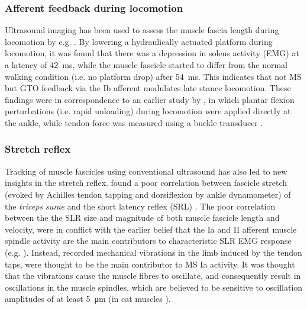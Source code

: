 \subsubsection{Afferent feedback during locomotion}
Ultrasound imaging has been used to assess the muscle fascia length during locomotion by e.g. \citeauthor{klint_afferent_2009} \cite{klint_afferent_2009}. By lowering a hydraulically actuated platform during locomotion, it was found that there was a depression in soleus activity (EMG) at a latency of \SI{42}{\milli\second}, while the muscle fascicle started to differ from the normal walking condition (i.e. no platform drop) after \SI{54}{\milli\second}. This indicates that not MS but GTO feedback via the Ib afferent modulates late stance locomotion. These findings were in correspondence to an earlier study by \citeauthor{grey_positive_2007}, in which plantar flexion perturbations (i.e. rapid unloading) during locomotion were applied directly at the ankle, while tendon force was measured using a buckle transducer \cite{grey_positive_2007}. 



\subsubsection{Stretch reflex}
Tracking of muscle fascicles using conventional ultrasound has also led to new insights in the stretch reflex. \citeauthor{cronin_triceps_2015} found a poor correlation between fascicle stretch (evoked by Achilles tendon tapping and dorsiflexion by ankle dynamometer) of the \textit{triceps surae} and the short latency reflex (SRL) \cite{cronin_triceps_2015}. The poor correlation between the the SLR size and magnitude of both muscle fascicle length and velocity, were in conflict with the earlier belief that the Ia and II afferent muscle spindle activity are the main contributors to characteristic SLR EMG response (e.g. \cite{schuurmans_monosynaptic_2009}). Instead, recorded mechanical vibrations in the limb induced by the tendon taps, were thought to be the main contributor to MS Ia activity. It was thought that the vibrations cause the muscle fibres to oscillate, and consequently result in oscillations in the muscle spindles, which are believed to be sensitive to oscillation amplitudes of at least \SI{5}{\micro\meter} (in cat muscles \cite{brown_relative_1967}). 

